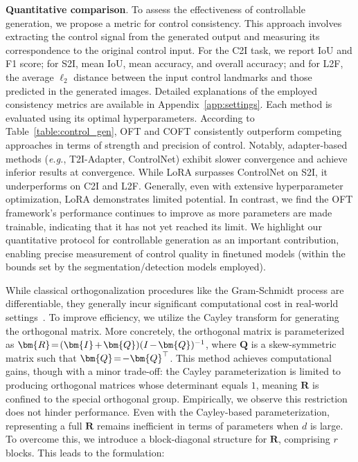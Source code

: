 \textbf{Quantitative comparison}. To assess the effectiveness of controllable generation, we propose a metric for control consistency. This approach involves extracting the control signal from the generated output and measuring its correspondence to the original control input. For the C2I task, we report IoU and F1 score; for S2I, mean IoU, mean accuracy, and overall accuracy; and for L2F, the average $\ell_2$ distance between the input control landmarks and those predicted in the generated images. Detailed explanations of the employed consistency metrics are available in Appendix~\ref{app:settings}. Each method is evaluated using its optimal hyperparameters. According to Table~\ref{table:control_gen}, OFT and COFT consistently outperform competing approaches in terms of strength and precision of control. Notably, adapter-based methods (\emph{e.g.}, T2I-Adapter, ControlNet) exhibit slower convergence and achieve inferior results at convergence. While LoRA surpasses ControlNet on S2I, it underperforms on C2I and L2F. Generally, even with extensive hyperparameter optimization, LoRA demonstrates limited potential. In contrast, we find the OFT framework’s performance continues to improve as more parameters are made trainable, indicating that it has not yet reached its limit. We highlight our quantitative protocol for controllable generation as an important contribution, enabling precise measurement of control quality in finetuned models (within the bounds set by the segmentation/detection models employed).

While classical orthogonalization procedures like the Gram-Schmidt process are differentiable, they generally incur significant computational cost in real-world settings~\cite{liu2021orthogonal}. To improve efficiency, we utilize the Cayley transform for generating the orthogonal matrix. More concretely, the orthogonal matrix is parameterized as $\thickmuskip=2mu \medmuskip=2mu \bm{R}=(\bm{I}+\bm{Q})(I-\bm{Q})^{-1}$, where $\bm{Q}$ is a skew-symmetric matrix such that $\thickmuskip=2mu \medmuskip=2mu \bm{Q}=-\bm{Q}^\top$. This method achieves computational gains, though with a minor trade-off: the Cayley parameterization is limited to producing orthogonal matrices whose determinant equals $1$, meaning $\bm{R}$ is confined to the special orthogonal group. Empirically, we observe this restriction does not hinder performance. Even with the Cayley-based parameterization, representing a full $\bm{R}$ remains inefficient in terms of parameters when $d$ is large. To overcome this, we introduce a block-diagonal structure for $\bm{R}$, comprising $r$ blocks. This leads to the formulation:

